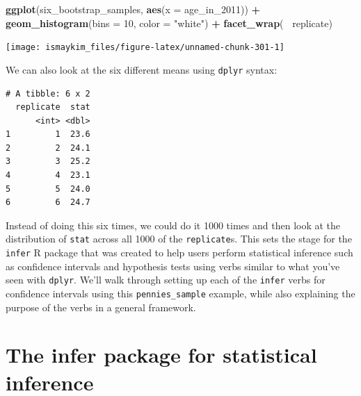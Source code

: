 \documentclass[12pt,]{krantz}
\makeatletter
\newenvironment{Shaded}{\begin{snugshade}}{\end{snugshade}}
\newcommand{\KeywordTok}[1]{\textcolor[rgb]{0.27,0.27,0.27}{\textbf{#1}}}
\newcommand{\DataTypeTok}[1]{\textcolor[rgb]{0.27,0.27,0.27}{#1}}
\newcommand{\DecValTok}[1]{\textcolor[rgb]{0.06,0.06,0.06}{#1}}
\newcommand{\StringTok}[1]{\textcolor[rgb]{0.5,0.5,0.5}{#1}}
\newcommand{\OperatorTok}[1]{\textcolor[rgb]{0.43,0.43,0.43}{\textbf{#1}}}
\newcommand{\NormalTok}[1]{#1}
\newenvironment{kframe}{%
\medskip{}
\setlength{\fboxsep}{.8em}
 \def\at@end@of@kframe{}%
 \ifinner\ifhmode%
  \def\at@end@of@kframe{\end{minipage}}%
  \begin{minipage}{\columnwidth}%
 \fi\fi%
 \def\FrameCommand##1{\hskip\@totalleftmargin \hskip-\fboxsep
 \colorbox{shadecolor}{##1}\hskip-\fboxsep
     \hskip-\linewidth \hskip-\@totalleftmargin \hskip\columnwidth}%
 \MakeFramed {\advance\hsize-\width
   \@totalleftmargin\z@ \linewidth\hsize
   \@setminipage}}%
 {\par\unskip\endMakeFramed%
 \at@end@of@kframe}
\renewenvironment{Shaded}{\begin{kframe}}{\end{kframe}}
\makeatother
\begin{document}
\begin{Shaded}
\begin{Highlighting}[]
\KeywordTok{ggplot}\NormalTok{(six_bootstrap_samples, }\KeywordTok{aes}\NormalTok{(}\DataTypeTok{x =}\NormalTok{ age_in_}\DecValTok{2011}\NormalTok{)) }\OperatorTok{+}
\StringTok{  }\KeywordTok{geom_histogram}\NormalTok{(}\DataTypeTok{bins =} \DecValTok{10}\NormalTok{, }\DataTypeTok{color =} \StringTok{"white"}\NormalTok{) }\OperatorTok{+}
\StringTok{  }\KeywordTok{facet_wrap}\NormalTok{(}\OperatorTok{~}\StringTok{ }\NormalTok{replicate)}
\end{Highlighting}
\end{Shaded}

\begin{center}\texttt{[image: ismaykim\_files/figure-latex/unnamed-chunk-301-1]} \end{center}

We can also look at the six different means using \texttt{dplyr} syntax:

\begin{Shaded}
\end{Shaded}

\begin{verbatim}
# A tibble: 6 x 2
  replicate  stat
      <int> <dbl>
1         1  23.6
2         2  24.1
3         3  25.2
4         4  23.1
5         5  24.0
6         6  24.7
\end{verbatim}

Instead of doing this six times, we could do it 1000 times and then look
at the distribution of \texttt{stat} across all 1000 of the
\texttt{replicate}s. This sets the stage for the \texttt{infer} R
package \citep{R-infer} that was created to help users perform
statistical inference such as confidence intervals and hypothesis tests
using verbs similar to what you've seen with \texttt{dplyr}. We'll walk
through setting up each of the \texttt{infer} verbs for confidence
intervals using this \texttt{pennies\_sample} example, while also
explaining the purpose of the verbs in a general framework.

\section{The infer package for statistical
inference}\label{the-infer-package-for-statistical-inference}
\end{document}

